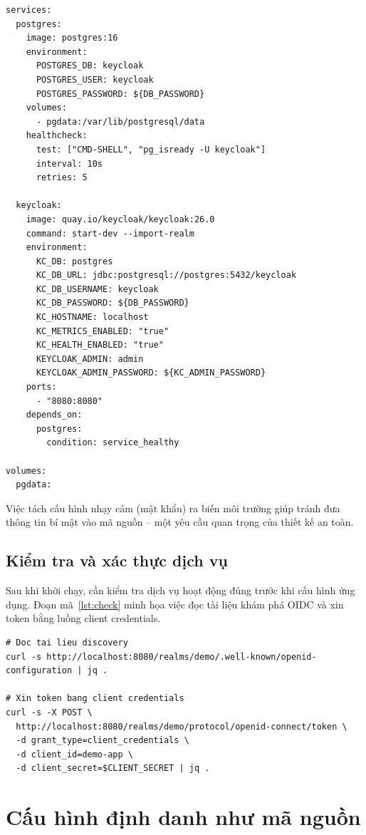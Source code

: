 \begin{lstlisting}[caption={Cấu hình Docker Compose cho Keycloak và PostgreSQL},label={lst:compose}]
services:
  postgres:
    image: postgres:16
    environment:
      POSTGRES_DB: keycloak
      POSTGRES_USER: keycloak
      POSTGRES_PASSWORD: ${DB_PASSWORD}
    volumes:
      - pgdata:/var/lib/postgresql/data
    healthcheck:
      test: ["CMD-SHELL", "pg_isready -U keycloak"]
      interval: 10s
      retries: 5

  keycloak:
    image: quay.io/keycloak/keycloak:26.0
    command: start-dev --import-realm
    environment:
      KC_DB: postgres
      KC_DB_URL: jdbc:postgresql://postgres:5432/keycloak
      KC_DB_USERNAME: keycloak
      KC_DB_PASSWORD: ${DB_PASSWORD}
      KC_HOSTNAME: localhost
      KC_METRICS_ENABLED: "true"
      KC_HEALTH_ENABLED: "true"
      KEYCLOAK_ADMIN: admin
      KEYCLOAK_ADMIN_PASSWORD: ${KC_ADMIN_PASSWORD}
    ports:
      - "8080:8080"
    depends_on:
      postgres:
        condition: service_healthy

volumes:
  pgdata:
\end{lstlisting}

Việc tách cấu hình nhạy cảm (mật khẩu) ra biến môi trường giúp tránh đưa thông
tin bí mật vào mã nguồn -- một yêu cầu quan trọng của thiết kế an toàn.

\subsection{Kiểm tra và xác thực dịch vụ}
\label{subsec:kiemtra}

Sau khi khởi chạy, cần kiểm tra dịch vụ hoạt động đúng trước khi cấu hình ứng
dụng. Đoạn mã~\ref{lst:check} minh họa việc đọc tài liệu khám phá OIDC và xin
token bằng luồng client credentials.

\begin{lstlisting}[caption={Kiểm tra điểm cuối OIDC của Keycloak},label={lst:check}]
# Doc tai lieu discovery
curl -s http://localhost:8080/realms/demo/.well-known/openid-configuration | jq .

# Xin token bang client credentials
curl -s -X POST \
  http://localhost:8080/realms/demo/protocol/openid-connect/token \
  -d grant_type=client_credentials \
  -d client_id=demo-app \
  -d client_secret=$CLIENT_SECRET | jq .
\end{lstlisting}

\section{Cấu hình định danh như mã nguồn}
\label{sec:realm}

